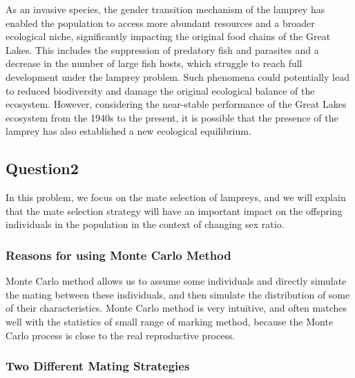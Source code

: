 \documentclass[12pt]{article}
\begin{document}
As an invasive species, the gender transition mechanism of the lamprey has enabled the population
to access more abundant resources and a broader ecological niche, significantly impacting the
original food chains of the Great Lakes. This includes the suppression of predatory fish and
parasites and a decrease in the number of large fish hosts, which struggle to reach full
development under the lamprey problem. Such phenomena could potentially lead to reduced
biodiversity and damage the original ecological balance of the ecosystem. However, considering
the near-stable performance of the Great Lakes ecosystem from the 1940s to the present, it is
possible that the presence of the lamprey has also established a new ecological equilibrium.

\subsection{Question2}

In this problem, we focus on the mate selection of lampreys, and we will explain that the mate
selection strategy will have an important impact on the offspring individuals in the
population in the context of changing sex ratio.

\subsubsection{Reasons for using Monte Carlo Method}

Monte Carlo method allows us to assume some individuals and directly simulate the mating between
these individuals, and then simulate the distribution of some of their characteristics.
Monte Carlo method is very intuitive, and often matches well with the statistics of small
range of marking method, because the Monte Carlo process is close to the real reproductive process.

\subsubsection{Two Different Mating Strategies}
\end{document}
